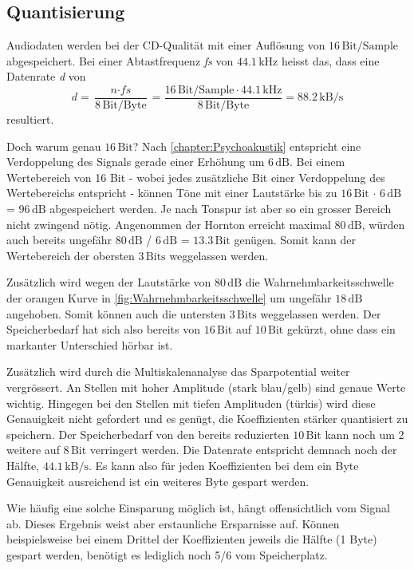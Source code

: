 \begin{refsection}
\subsection{Quantisierung}
\label{chapter=quantisierung}
Audiodaten werden bei der CD-Qualität mit einer Auflösung von $16\,\text{Bit/Sample}$ abgespeichert. 
Bei einer Abtastfrequenz \textit{fs} von $44.1\,\text{kHz}$ heisst das, dass eine Datenrate \textit{d} von 
\begin{equation}
\textit{d} = \frac{\textit{n} \cdot \textit{fs}}{8\,\text{Bit/Byte}} = \frac{16\,\text{Bit/Sample} \cdot 44.1\,\text{kHz}}{8\,\text{Bit/Byte}} = 88.2\,\text{kB/s}
\end{equation}
resultiert.

Doch warum genau $16\,\text{Bit}$?
Nach \autoref{chapter:Psychoakustik} entspricht eine Verdoppelung des Signals gerade einer Erhöhung um $6\,\text{dB}$.
Bei einem Wertebereich von 16 Bit - wobei jedes zusätzliche Bit einer Verdoppelung des Wertebereichs entspricht - können Töne mit einer Lautstärke bis zu
$16\,\text{Bit}$ $\cdot$ $6\,\text{dB}$ = $96\,\text{dB}$
abgespeichert werden.
Je nach Tonspur ist aber so ein grosser Bereich nicht zwingend nötig.
Angenommen der Hornton erreicht maximal $80\,\text{dB}$, würden auch bereits ungefähr
$80\,\text{dB}$ / $6\,\text{dB}$ =  $13.3\,\text{Bit}$
genügen. 
Somit kann der Wertebereich der obersten $3\,\text{Bits}$ weggelassen werden.

Zusätzlich wird wegen der Lautstärke von $80\,\text{dB}$ die Wahrnehmbarkeitsschwelle der orangen Kurve in \autoref{fig:Wahrnehmbarkeitsschwelle} um ungefähr $18\,\text{dB}$ angehoben.
Somit können auch die untersten $3\,\text{Bits}$ weggelassen werden.
Der Speicherbedarf hat sich also bereits von $16\,\text{Bit}$ auf $10\,\text{Bit}$ gekürzt, ohne dass ein markanter Unterschied hörbar ist.

Zusätzlich wird durch die Multiskalenanalyse das Sparpotential weiter vergrössert.
An Stellen mit hoher Amplitude (stark blau/gelb) sind genaue Werte wichtig.
Hingegen bei den Stellen mit tiefen Amplituden (türkis) wird diese Genauigkeit nicht gefordert und es genügt, die Koeffizienten stärker quantisiert zu speichern.
Der Speicherbedarf von den bereits reduzierten $10\,\text{Bit}$ kann noch um 2 weitere auf $8\,\text{Bit}$ verringert werden.
Die Datenrate entspricht demnach noch der Hälfte, $44.1\,\text{kB/s}$.
Es kann also für jeden Koeffizienten bei dem ein Byte Genauigkeit ausreichend ist ein weiteres Byte gespart werden.

Wie häufig eine solche Einsparung möglich ist, hängt offensichtlich vom Signal ab.
Dieses Ergebnis weist aber erstaunliche Ersparnisse auf.
Können beispielsweise bei einem Drittel der Koeffizienten jeweils die Hälfte (1 Byte) gespart werden, benötigt es lediglich noch 5/6 vom Speicherplatz.


\end{refsection}
